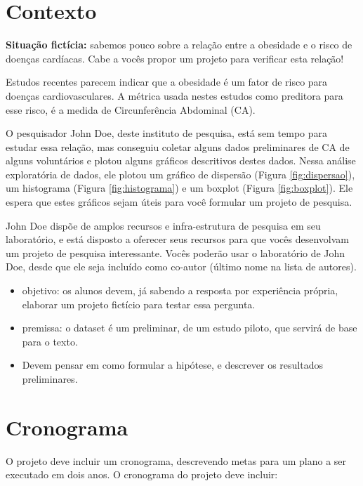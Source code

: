 \documentclass[a4paper]{article}
\begin{document}
\section{Contexto}

{\bf Situação fictícia:} sabemos pouco sobre a relação entre a
obesidade e o risco de doenças cardíacas. Cabe a vocês propor um
projeto para verificar esta relação!

Estudos recentes parecem indicar que a obesidade é um fator de risco
para doenças cardiovasculares. A métrica usada nestes estudos como
preditora para esse risco, é a medida de Circunferência Abdominal
(CA).

O pesquisador John Doe, deste instituto de pesquisa, está sem tempo
para estudar essa relação, mas conseguiu coletar alguns dados
preliminares de CA de alguns voluntários e plotou alguns gráficos
descritivos destes dados. Nessa análise exploratória de dados, ele
plotou um gráfico de dispersão (Figura \ref{fig:dispersao}), um
histograma (Figura \ref{fig:histograma}) e um boxplot (Figura
\ref{fig:boxplot}). Ele espera que estes gráficos sejam úteis para
você formular um projeto de pesquisa.

John Doe dispõe de amplos recursos e infra-estrutura de pesquisa em
seu laboratório, e está disposto a oferecer seus recursos para que
vocês desenvolvam um projeto de pesquisa interessante. Vocês poderão
usar o laboratório de John Doe, desde que ele seja incluído como
co-autor (último nome na lista de autores).

\begin{itemize}
\item objetivo: os alunos devem, já sabendo a resposta por experiência
  própria, elaborar um projeto fictício para testar essa pergunta.
\item premissa: o dataset é um preliminar, de um estudo piloto, que
  servirá de base para o texto.
\item Devem pensar em como formular a hipótese, e descrever os
  resultados preliminares.
\end{itemize}

\section{Cronograma}

O projeto deve incluir um cronograma, descrevendo metas para um plano
a ser executado em dois anos. O cronograma do projeto deve incluir:
\end{document}
